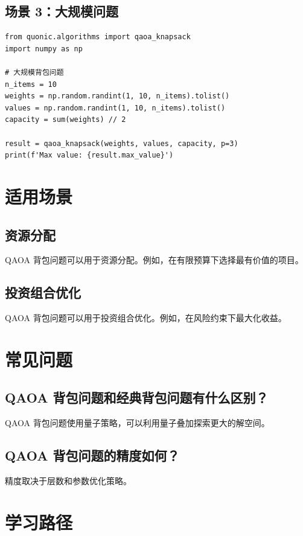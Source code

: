 \documentclass[12pt,a4paper]{article}
\begin{document}
\subsection{场景 3：大规模问题}

\begin{verbatim}
from quonic.algorithms import qaoa_knapsack
import numpy as np

# 大规模背包问题
n_items = 10
weights = np.random.randint(1, 10, n_items).tolist()
values = np.random.randint(1, 10, n_items).tolist()
capacity = sum(weights) // 2

result = qaoa_knapsack(weights, values, capacity, p=3)
print(f'Max value: {result.max_value}')
\end{verbatim}

\section{适用场景}

\subsection{资源分配}

QAOA 背包问题可以用于资源分配。例如，在有限预算下选择最有价值的项目。

\subsection{投资组合优化}

QAOA 背包问题可以用于投资组合优化。例如，在风险约束下最大化收益。

\section{常见问题}

\subsection{QAOA 背包问题和经典背包问题有什么区别？}

QAOA 背包问题使用量子策略，可以利用量子叠加探索更大的解空间。

\subsection{QAOA 背包问题的精度如何？}

精度取决于层数和参数优化策略。

\section{学习路径}
\end{document}
